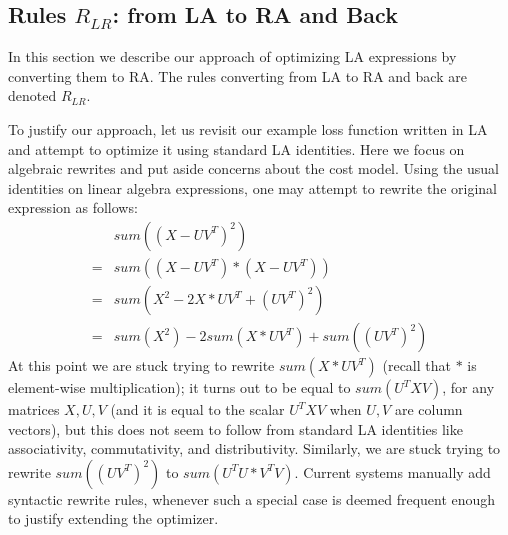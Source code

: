 
\subsection{Rules \texorpdfstring{$R_{LR}$}{RLR}: from  LA to RA and Back}
In this section we describe our approach of optimizing LA expressions
by converting them to RA.  The rules converting from LA to RA and back
are denoted $R_{LR}$.

To justify our approach, let us revisit our example loss function
written in LA and attempt to optimize it using standard LA identities.
Here we focus on algebraic rewrites and put aside concerns about the
cost model. Using the usual identities on linear algebra expressions,
one may attempt to rewrite the original expression as follows:
\begin{align*}
& sum((X-UV^T)^2) \\
= &sum((X-UV^T)*(X-UV^T)) \\
=&sum(X^2-2X*UV^T+(UV^T)^2) \\
= & sum(X^2) - 2sum(X*UV^T) + sum((UV^T)^2)
\end{align*}
At this point we are stuck trying to rewrite $sum(X*UV^T)$ (recall
that $*$ is element-wise multiplication); it turns out to be equal to
$sum(U^TXV)$, for any matrices $X,U,V$ (and it is equal to the scalar
$U^TXV$ when $U, V$ are column vectors), but this does not seem to
follow from standard LA identities like associativity, commutativity,
and distributivity.  Similarly, we are stuck trying to rewrite
$sum((UV^T)^2)$ to $sum(U^TU * V^TV)$.  Current systems manually add
syntactic rewrite rules, whenever such a special case is deemed
frequent enough to justify extending the optimizer.


